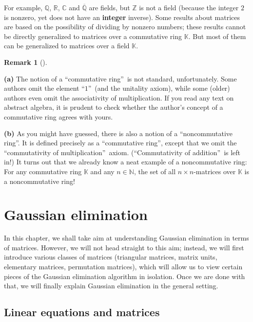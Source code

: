 \documentclass[numbers=enddot,12pt,final,onecolumn,notitlepage]{scrartcl}%
\theoremstyle{definition}
\newtheorem{remk}[theo]{Remark}
\newenvironment{remark}[1][]
{\begin{remk}[#1]\begin{leftbar}}
{\end{leftbar}\end{remk}}
\begin{document}
For example, $\mathbb{Q}$, $\mathbb{R}$, $\mathbb{C}$ and $\overline
{\mathbb{Q}}$ are fields, but $\mathbb{Z}$ is not a field (because the integer
$2$ is nonzero, yet does not have an \textbf{integer} inverse). Some results
about matrices are based on the possibility of dividing by nonzero numbers;
these results cannot be directly generalized to matrices over a commutative
ring $\mathbb{K}$. But most of them can be generalized to matrices over a
field $\mathbb{K}$.

\begin{remark}
\textbf{(a)} The notion of a \textquotedblleft commutative
ring\textquotedblright\ is not standard, unfortunately. Some authors omit the
element \textquotedblleft$1$\textquotedblright\ (and the unitality axiom),
while some (older) authors even omit the associativity of multiplication. If
you read any text on abstract algebra, it is prudent to check whether the
author's concept of a commutative ring agrees with yours.

\textbf{(b)} As you might have guessed, there is also a notion of a
\textquotedblleft noncommutative ring\textquotedblright. It is defined
precisely as a \textquotedblleft commutative ring\textquotedblright, except
that we omit the \textquotedblleft commutativity of
multiplication\textquotedblright\ axiom. (\textquotedblleft Commutativity of
addition\textquotedblright\ is left in!) It turns out that we already know a
neat example of a noncommutative ring: For any commutative ring $\mathbb{K}$
and any $n\in\mathbb{N}$, the set of all $n\times n$-matrices over
$\mathbb{K}$ is a noncommutative ring!
\end{remark}

\section{Gaussian elimination}

In this chapter, we shall take aim at understanding Gaussian elimination in
terms of matrices. However, we will not head straight to this aim; instead, we
will first introduce various classes of matrices (triangular matrices, matrix
units, elementary matrices, permutation matrices), which will allow us to view
certain pieces of the Gaussian elimination algorithm in isolation. Once we are
done with that, we will finally explain Gaussian elimination in the general setting.

\subsection{Linear equations and matrices}
\end{document}
